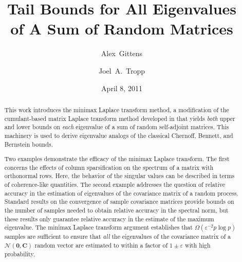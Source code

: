 \documentclass[11pt,letterpaper,twoside,reqno,nosumlimits]{amsart}
\title[Tail Bounds for Eigenvalues of Random Matrices]{Tail Bounds for All Eigenvalues \\ of A Sum of Random Matrices}
\date{April 8, 2011}
\author[A.~Gittens]{Alex~Gittens}
\author[J.~A.~Tropp]{Joel~A.~Tropp}
\newcommand{\mat}[1]{\ensuremath{\bm{#1}}} %
\renewcommand{\vec}[1]{\ensuremath{\bm{#1}}}
\theoremstyle{remark}
\numberwithin{equation}{section}
\numberwithin{thm}{section}
\numberwithin{prop}{section}
\numberwithin{defn}{section}
\numberwithin{remark}{section}
\begin{document}
\begin{abstract}
This work introduces the minimax Laplace transform method, a modification of the cumulant-based matrix Laplace transform method developed in \cite{T10a} that yields \emph{both} upper and lower bounds on \emph{each} eigenvalue of a sum of random self-adjoint matrices. This machinery is used to derive eigenvalue analogs of the classical Chernoff, Bennett, and Bernstein bounds.

Two examples demonstrate the efficacy of the minimax Laplace transform. The first concerns the effects of column sparsification on the spectrum of a matrix with orthonormal rows. Here, the behavior of the singular values can be described in terms of coherence-like quantities. The second example addresses the question of relative accuracy in the estimation of eigenvalues of the covariance matrix of a random process. Standard results on the convergence of sample covariance matrices provide bounds on the number of samples needed to obtain relative accuracy in the spectral norm, but these results only guarantee relative accuracy in the estimate of the maximum eigenvalue. The minimax Laplace transform argument establishes that $\Omega(\varepsilon^{-2} p \log p)$ samples are sufficient to ensure that \emph{all} the eigenvalues of the covariance matrix of a $\mathcal{N}(\vec{0}, \mat{C})$ random vector are estimated to within a factor of $1 \pm \varepsilon$ with high probability.


\end{abstract}
\end{document}
